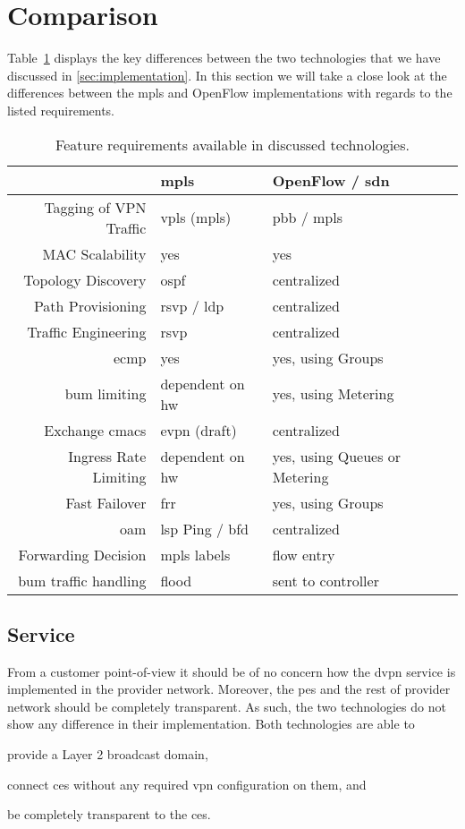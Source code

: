 \section{Comparison} %
\label{sec:results}

Table~\ref{tb:reqs} displays the key differences between the two technologies that we have discussed in \ref{sec:implementation}. In this section we will take a close look at the differences between the \ac{mpls} and OpenFlow implementations with regards to the listed requirements.

\begin{table}[h]
	\centering
	\begin{tabular}{r|lll}
	 & \acs{mpls} & OpenFlow / \acs{sdn}\\
	\hline
	Tagging of VPN Traffic & \acs{vpls} (\acs{mpls}) & \acs{pbb} / \acs{mpls}\\
	MAC Scalability & yes & yes\\
	Topology Discovery & \acs{ospf} & centralized\\
	Path Provisioning & \acs{rsvp} / \acs{ldp} & centralized\\
	Traffic Engineering & \acs{rsvp} & centralized\\
	\ac{ecmp} & yes & yes, using Groups\\
	\ac{bum} limiting & dependent on \acs{hw} & yes, using Metering\\
	Exchange \acsp{cmac} & \ac{evpn} (draft) & centralized\\
	Ingress Rate Limiting & dependent on \acs{hw} & yes, using Queues or Metering\\
	Fast Failover & \acs{frr} & yes, using Groups\\
	\acs{oam} & \acs{lsp} Ping / \acs{bfd} & centralized\\
	\hline
	Forwarding Decision & \acs{mpls} labels & flow entry \\
	\ac{bum} traffic handling & flood & sent to controller\\
	\end{tabular}
	\caption{Feature requirements available in discussed technologies.}
	\label{tb:reqs}
\end{table}

\subsection{Service} %
\label{sub:service}

From a customer point-of-view it should be of no concern how the \ac{dvpn} service is implemented in the provider network. Moreover, the \acp{pe} and the rest of provider network should be completely transparent. As such, the two technologies do not show any difference in their implementation. Both technologies are able to 
\begin{inparaenum}[\itshape 1\upshape)]
	\item provide a Layer 2 broadcast domain,
	\item connect \acp{ce} without any required \ac{vpn} configuration on them, and
	\item be completely transparent to the \acp{ce}.
\end{inparaenum}

